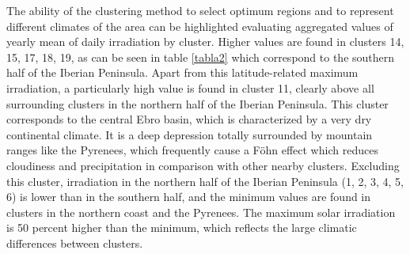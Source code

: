  
The ability of the clustering method to select optimum regions and to represent different climates of the area can be highlighted evaluating aggregated values of yearly mean of daily irradiation by cluster. Higher values are found in clusters 14, 15, 17, 18, 19, as can be seen in table \ref{tabla2} which correspond to the southern half of the Iberian Peninsula. Apart from this latitude-related maximum irradiation, a particularly high value is found in cluster 11, clearly above all surrounding clusters in the northern half of the Iberian Peninsula. This cluster corresponds to the central Ebro basin, which is characterized by a very dry continental climate. It is a deep depression totally surrounded by mountain ranges like the Pyrenees,  which frequently cause a Föhn effect which reduces cloudiness and precipitation in comparison with other nearby clusters. Excluding this cluster, irradiation in the northern half of the Iberian Peninsula (1, 2, 3, 4, 5, 6) is lower than in the southern half, and the minimum values are found in clusters in the northern coast and the Pyrenees. The maximum solar irradiation is 50 percent higher than the minimum, which reflects the large climatic differences between clusters.

